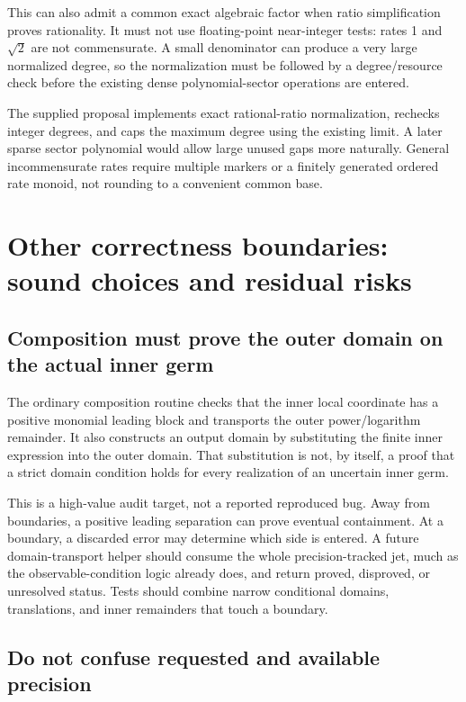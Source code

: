 This can also admit a common exact algebraic factor when ratio simplification proves rationality. It must not use floating-point near-integer tests: rates 1 and $\sqrt2$ are not commensurate. A small denominator can produce a very large normalized degree, so the normalization must be followed by a degree/resource check before the existing dense polynomial-sector operations are entered.

The supplied proposal implements exact rational-ratio normalization, rechecks integer degrees, and caps the maximum degree using the existing limit. A later sparse sector polynomial would allow large unused gaps more naturally. General incommensurate rates require multiple markers or a finitely generated ordered rate monoid, not rounding to a convenient common base.

\section{Other correctness boundaries: sound choices and residual risks}

\subsection{Composition must prove the outer domain on the actual inner germ}

The ordinary composition routine checks that the inner local coordinate has a positive monomial leading block and transports the outer power/logarithm remainder. It also constructs an output domain by substituting the finite inner expression into the outer domain. That substitution is not, by itself, a proof that a strict domain condition holds for every realization of an uncertain inner germ.\cite{operations}

This is a high-value audit target, not a reported reproduced bug. Away from boundaries, a positive leading separation can prove eventual containment. At a boundary, a discarded error may determine which side is entered. A future domain-transport helper should consume the whole precision-tracked jet, much as the observable-condition logic already does, and return proved, disproved, or unresolved status. Tests should combine narrow conditional domains, translations, and inner remainders that touch a boundary.

\subsection{Do not confuse requested and available precision}

